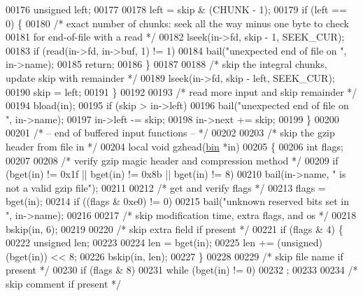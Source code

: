 \begin{DoxyCode}
{00176         \textcolor{keywordtype}{unsigned} left;
00177 
00178         left = skip & (CHUNK - 1);
00179         \textcolor{keywordflow}{if} (left == 0) \{
00180             \textcolor{comment}{/* exact number of chunks: seek all the way minus one byte to check}
00181 \textcolor{comment}{               for end-of-file with a read */}
00182             lseek(in->fd, skip - 1, SEEK\_CUR);
00183             \textcolor{keywordflow}{if} (read(in->fd, in->buf, 1) != 1)
00184                 bail(\textcolor{stringliteral}{"unexpected end of file on "}, in->name);
00185             \textcolor{keywordflow}{return};
00186         \}
00187 
00188         \textcolor{comment}{/* skip the integral chunks, update skip with remainder */}
00189         lseek(in->fd, skip - left, SEEK\_CUR);
00190         skip = left;
00191     \}
00192 
00193     \textcolor{comment}{/* read more input and skip remainder */}
00194     bload(in);
00195     \textcolor{keywordflow}{if} (skip > in->left)
00196         bail(\textcolor{stringliteral}{"unexpected end of file on "}, in->name);
00197     in->left -= skip;
00198     in->next += skip;
00199 \}
00200 
00201 \textcolor{comment}{/* -- end of buffered input functions -- */}
00202 
00203 \textcolor{comment}{/* skip the gzip header from file in */}
00204 local \textcolor{keywordtype}{void} gzhead(\hyperlink{structbin}{bin} *in)
00205 \{
00206     \textcolor{keywordtype}{int} flags;
00207 
00208     \textcolor{comment}{/* verify gzip magic header and compression method */}
00209     \textcolor{keywordflow}{if} (bget(in) != 0x1f || bget(in) != 0x8b || bget(in) != 8)
00210         bail(in->name, \textcolor{stringliteral}{" is not a valid gzip file"});
00211 
00212     \textcolor{comment}{/* get and verify flags */}
00213     flags = bget(in);
00214     \textcolor{keywordflow}{if} ((flags & 0xe0) != 0)
00215         bail(\textcolor{stringliteral}{"unknown reserved bits set in "}, in->name);
00216 
00217     \textcolor{comment}{/* skip modification time, extra flags, and os */}
00218     bskip(in, 6);
00219 
00220     \textcolor{comment}{/* skip extra field if present */}
00221     \textcolor{keywordflow}{if} (flags & 4) \{
00222         \textcolor{keywordtype}{unsigned} len;
00223 
00224         len = bget(in);
00225         len += (unsigned)(bget(in)) << 8;
00226         bskip(in, len);
00227     \}
00228 
00229     \textcolor{comment}{/* skip file name if present */}
00230     \textcolor{keywordflow}{if} (flags & 8)
00231         \textcolor{keywordflow}{while} (bget(in) != 0)
00232             ;
00233 
00234     \textcolor{comment}{/* skip comment if present */}
}
\end{DoxyCode}
